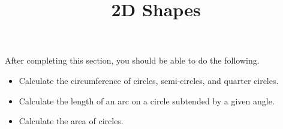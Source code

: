 \documentclass{ximera}
\title{2D Shapes}
\begin{document}
\begin{abstract} 
\end{abstract}

\maketitle

\begin{sectionOutcomes}
After completing this section, you should be able to do the following.

\begin{itemize}
	\item Calculate the circumference of circles, semi-circles, and quarter circles. 
    \item Calculate the length of an arc on a circle subtended by a given angle. 
    \item Calculate the area of circles.

\end{itemize}
\end{sectionOutcomes}
\end{document}
